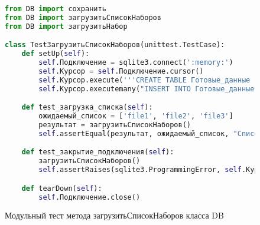 \begin{figure}[H]
\begin{lstlisting}[language=Python]
from DB import сохранить
from DB import загрузитьСписокНаборов
from DB import загрузитьНабор

class TestЗагрузитьСписокНаборов(unittest.TestCase):
    def setUp(self):
        self.Подключение = sqlite3.connect(':memory:')
        self.Курсор = self.Подключение.cursor()
        self.Курсор.execute('''CREATE TABLE Готовые_данные (Адрес_файла TEXT)''')
        self.Курсор.executemany("INSERT INTO Готовые_данные (Адрес_файла) VALUES (?)", [('file1',), ('file2',), ('file3',)])

    def test_загрузка_списка(self):
        ожидаемый_список = ['file1', 'file2', 'file3']
        результат = загрузитьСписокНаборов()
        self.assertEqual(результат, ожидаемый_список, "Список наборов должен соответствовать ожидаемому")

    def test_закрытие_подключения(self):
        загрузитьСписокНаборов()
        self.assertRaises(sqlite3.ProgrammingError, self.Курсор.execute, "SELECT * FROM Готовые_данные")

    def tearDown(self):
        self.Подключение.close()
\end{lstlisting}  
\caption{Модульный тест метода загрузитьСписокНаборов класса DB}
\label{test5:image}
\end{figure}


